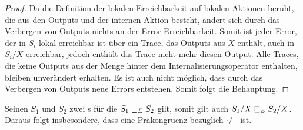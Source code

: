 \begin{proof}
  Da die Definition der lokalen Erreichbarkeit auf lokalen Aktionen beruht, die
  aus den Outputs und der internen Aktion besteht, ändert sich durch das
  Verbergen von Outputs nichts an der Error-Erreichbarkeit. Somit ist jeder
  Error, der in $S_i$ lokal erreichbar ist über ein Trace, das Outputs aus $X$
  enthält, auch in $S_i/X$ erreichbar, jedoch enthält das Trace
  nicht mehr diesen Output. Alle Traces, die keine Outputs aus der Menge hinter
  dem Internalisierungsoperator enthalten, bleiben unverändert erhalten. Es ist
  auch nicht möglich, dass durch das Verbergen von Outputs neue Errors
  entstehen. Somit folgt die Behauptung.
\end{proof}

\begin{satz}
  \label{satzPraeInternalisierung}
  Seinen $S_1$ und $S_2$ zwei \EIO{}s für die $S_1\sqsubseteq _E S_2$ gilt, somit gilt
  auch $S_1/X\sqsubseteq _E S_2/X$. Daraus folgt insbesondere, dass \ERel{} eine
  Präkongruenz bezüglich $\cdot /\cdot$ ist.
\end{satz}

